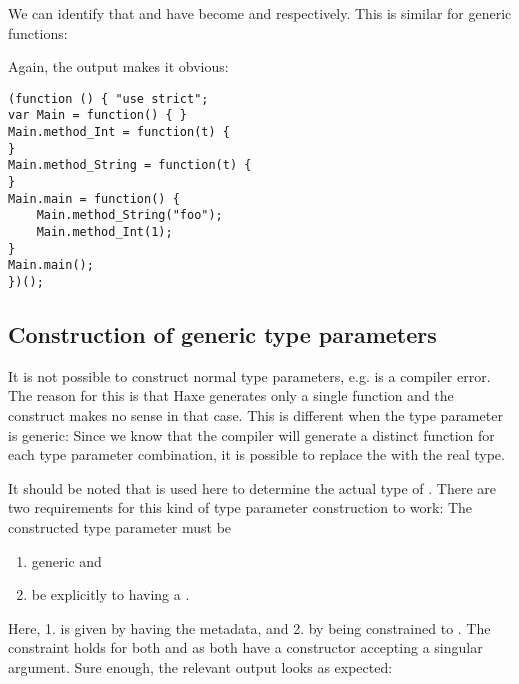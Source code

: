 We can identify that  and  have become  and  respectively. This is similar for generic functions:


Again, the  output makes it obvious:

\begin{lstlisting}
(function () { "use strict";
var Main = function() { }
Main.method_Int = function(t) {
}
Main.method_String = function(t) {
}
Main.main = function() {
	Main.method_String("foo");
	Main.method_Int(1);
}
Main.main();
})();
\end{lstlisting}


\subsection{Construction of generic type parameters}
\label{type-system-generic-type-parameter-construction}


It is not possible to construct normal type parameters, e.g.  is a compiler error. The reason for this is that Haxe generates only a single function and the construct makes no sense in that case. This is different when the type parameter is generic: Since we know that the compiler will generate a distinct function for each type parameter combination, it is possible to replace the   with the real type.


It should be noted that  is used here to determine the actual type of . There are two requirements for this kind of type parameter construction to work: The constructed type parameter must be

\begin{enumerate}
	\item generic and
	\item be explicitly  to having a .
\end{enumerate}

Here, 1. is given by  having the  metadata, and 2. by  being constrained to . The constraint holds for both  and  as both have a constructor accepting a singular  argument. Sure enough, the relevant  output looks as expected:


